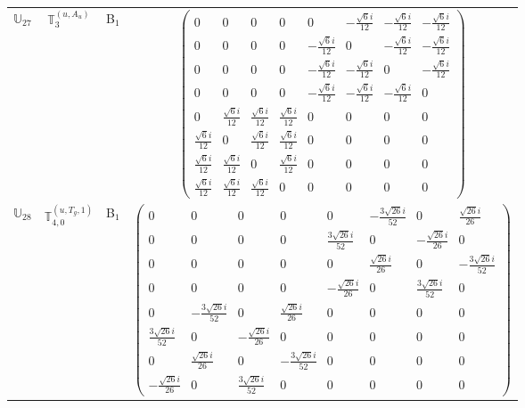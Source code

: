 \documentclass[fleqn,10pt,landscape]{article}
\begin{document}
\begin{itemize}
\begin{center}
\begin{longtable}{c|c|c|c}
$ \mathbb{U}_{27} $ & $\mathbb{T}_{3}^{(u,A_{u})}$ & B$_{1}$ & $\begin{pmatrix} 0 & 0 & 0 & 0 & 0 & - \frac{\sqrt{6} i}{12} & - \frac{\sqrt{6} i}{12} & - \frac{\sqrt{6} i}{12} \\ 0 & 0 & 0 & 0 & - \frac{\sqrt{6} i}{12} & 0 & - \frac{\sqrt{6} i}{12} & - \frac{\sqrt{6} i}{12} \\ 0 & 0 & 0 & 0 & - \frac{\sqrt{6} i}{12} & - \frac{\sqrt{6} i}{12} & 0 & - \frac{\sqrt{6} i}{12} \\ 0 & 0 & 0 & 0 & - \frac{\sqrt{6} i}{12} & - \frac{\sqrt{6} i}{12} & - \frac{\sqrt{6} i}{12} & 0 \\ 0 & \frac{\sqrt{6} i}{12} & \frac{\sqrt{6} i}{12} & \frac{\sqrt{6} i}{12} & 0 & 0 & 0 & 0 \\ \frac{\sqrt{6} i}{12} & 0 & \frac{\sqrt{6} i}{12} & \frac{\sqrt{6} i}{12} & 0 & 0 & 0 & 0 \\ \frac{\sqrt{6} i}{12} & \frac{\sqrt{6} i}{12} & 0 & \frac{\sqrt{6} i}{12} & 0 & 0 & 0 & 0 \\ \frac{\sqrt{6} i}{12} & \frac{\sqrt{6} i}{12} & \frac{\sqrt{6} i}{12} & 0 & 0 & 0 & 0 & 0 \end{pmatrix}$ \\
$ \mathbb{U}_{28} $ & $\mathbb{T}_{4,0}^{(u,T_{g},1)}$ & B$_{1}$ & $\begin{pmatrix} 0 & 0 & 0 & 0 & 0 & - \frac{3 \sqrt{26} i}{52} & 0 & \frac{\sqrt{26} i}{26} \\ 0 & 0 & 0 & 0 & \frac{3 \sqrt{26} i}{52} & 0 & - \frac{\sqrt{26} i}{26} & 0 \\ 0 & 0 & 0 & 0 & 0 & \frac{\sqrt{26} i}{26} & 0 & - \frac{3 \sqrt{26} i}{52} \\ 0 & 0 & 0 & 0 & - \frac{\sqrt{26} i}{26} & 0 & \frac{3 \sqrt{26} i}{52} & 0 \\ 0 & - \frac{3 \sqrt{26} i}{52} & 0 & \frac{\sqrt{26} i}{26} & 0 & 0 & 0 & 0 \\ \frac{3 \sqrt{26} i}{52} & 0 & - \frac{\sqrt{26} i}{26} & 0 & 0 & 0 & 0 & 0 \\ 0 & \frac{\sqrt{26} i}{26} & 0 & - \frac{3 \sqrt{26} i}{52} & 0 & 0 & 0 & 0 \\ - \frac{\sqrt{26} i}{26} & 0 & \frac{3 \sqrt{26} i}{52} & 0 & 0 & 0 & 0 & 0 \end{pmatrix}$ \\

\end{longtable}
\end{center}
\end{itemize}
\end{document}
